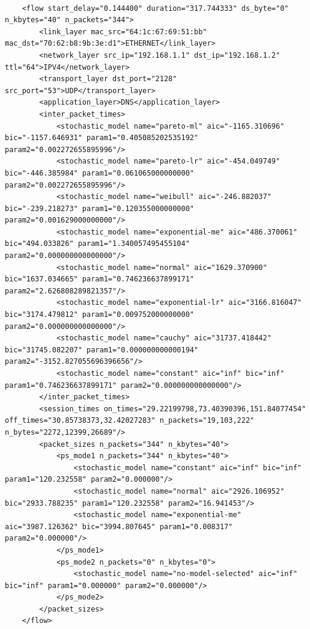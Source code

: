 \begin{verbatim}
               
	<flow start_delay="0.144400" duration="317.744333" ds_byte="0" n_kbytes="40" n_packets="344">
		<link_layer mac_src="64:1c:67:69:51:bb" mac_dst="70:62:b8:9b:3e:d1">ETHERNET</link_layer>
		<network_layer src_ip="192.168.1.1" dst_ip="192.168.1.2" ttl="64">IPV4</network_layer>
		<transport_layer dst_port="2128" src_port="53">UDP</transport_layer>
		<application_layer>DNS</application_layer>
		<inter_packet_times>
			<stochastic_model name="pareto-ml" aic="-1165.310696" bic="-1157.646931" param1="0.405085202535192" param2="0.002272655895996"/>
			<stochastic_model name="pareto-lr" aic="-454.049749" bic="-446.385984" param1="0.061065000000000" param2="0.002272655895996"/>
			<stochastic_model name="weibull" aic="-246.882037" bic="-239.218273" param1="0.120355000000000" param2="0.001629000000000"/>
			<stochastic_model name="exponential-me" aic="486.370061" bic="494.033826" param1="1.340057495455104" param2="0.000000000000000"/>
			<stochastic_model name="normal" aic="1629.370900" bic="1637.034665" param1="0.746236637899171" param2="2.626808289821357"/>
			<stochastic_model name="exponential-lr" aic="3166.816047" bic="3174.479812" param1="0.009752000000000" param2="0.000000000000000"/>
			<stochastic_model name="cauchy" aic="31737.418442" bic="31745.082207" param1="0.000000000000194" param2="-3152.827055696396656"/>
			<stochastic_model name="constant" aic="inf" bic="inf" param1="0.746236637899171" param2="0.000000000000000"/>
		</inter_packet_times>
		<session_times on_times="29.22199798,73.40390396,151.84077454" off_times="30.85738373,32.42027283" n_packets="19,103,222" n_bytes="2272,12399,26689"/>
		<packet_sizes n_packets="344" n_kbytes="40">
			<ps_mode1 n_packets="344" n_kbytes="40">
				<stochastic_model name="constant" aic="inf" bic="inf" param1="120.232558" param2="0.000000"/>
				<stochastic_model name="normal" aic="2926.106952" bic="2933.788235" param1="120.232558" param2="16.941453"/>
				<stochastic_model name="exponential-me" aic="3987.126362" bic="3994.807645" param1="0.008317" param2="0.000000"/>
			</ps_mode1>
			<ps_mode2 n_packets="0" n_kbytes="0">
				<stochastic_model name="no-model-selected" aic="inf" bic="inf" param1="0.000000" param2="0.000000"/>
			</ps_mode2>
		</packet_sizes>
	</flow>
	
\end{verbatim}

